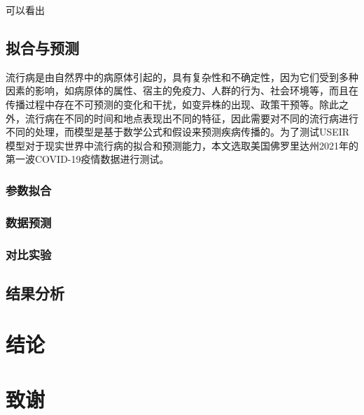 可以看出

\subsection{拟合与预测}
流行病是由自然界中的病原体引起的，具有复杂性和不确定性，因为它们受到多种因素的影响，如病原体的属性、宿主的免疫力、人群的行为、社会环境等，而且在传播过程中存在不可预测的变化和干扰，如变异株的出现、政策干预等。除此之外，流行病在不同的时间和地点表现出不同的特征，因此需要对不同的流行病进行不同的处理，而模型是基于数学公式和假设来预测疾病传播的。为了测试USEIR模型对于现实世界中流行病的拟合和预测能力，本文选取美国佛罗里达州2021年的第一波COVID-19疫情数据进行测试。

\subsubsection{参数拟合}
\subsubsection{数据预测}
\subsubsection{对比实验}
\subsection{结果分析}

\newpage
\section{结论}

\section*{致谢}
